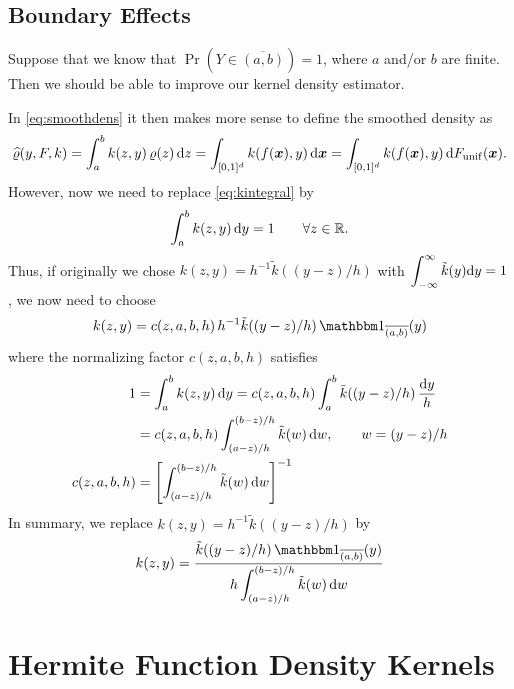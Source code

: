 \documentclass[letterpaper]{amsart}
\newcommand{\hvarrho}{\widehat{\varrho}}
\newcommand{\tk}{\tilde{k}}
\begin{document}
\subsection{Boundary Effects}
Suppose that we know that $\Pr(Y \in \overline{(a,b)}) = 1$, where $a$ and/or $b$ are finite.  Then we should be able to improve our kernel density estimator.

In \eqref{eq:smoothdens} it then makes more sense to define the smoothed density as
\begin{equation}
	\label{eq:smoothdens_bd}
	\hvarrho(y,F,k)
	= \int_{a}^{b} k(z,y) \, \varrho(z) \, \dif z \\
	= \int_{[0,1]^d} k(f(\vx),y) \,  \dif \vx
	= \int_{[0,1]^d} k(f(\vx),y) \,  \dif F_{\mathrm{unif}}(\vx).
\end{equation}
However, now we need to replace \eqref{eq:kintegral} by
\begin{equation}
	\label{eq:kintegral_bd}
	\int_{a}^{b} k(z,y) \, {\rm d} y = 1 \qquad \forall z \in \mathbb{R}.
\end{equation}
Thus, if originally we chose $k(z,y) = h^{-1}\tk((y-z)/h)$ with $\displaystyle\int_{-\infty}^\infty \tk(y) \dif y = 1$, we now need to choose 
\begin{equation*}
    k(z,y) = c(z,a,b,h) \, h^{-1}\tk((y-z)/h) \, \bbone_{\overline{(a,b)}}(y)
\end{equation*}
where the normalizing factor $c(z,a,b,h)$ satisfies
\begin{align*}
    1 & = \int_{a}^{b} k(z,y) \, \dif y = c(z,a,b,h) \int_{a}^{b} \tk((y-z)/h) \, \frac{\dif y}{h} \\
    & = c(z,a,b,h) \int_{(a-z)/h}^{(b-z)/h} \tk(w) \, \dif w,  \qquad w = (y-z)/h \\
    c(z,a,b,h) & = \left[ \int_{(a-z)/h}^{(b-z)/h} \tk(w) \, \dif w\right]^{-1}
\end{align*}
In summary, we replace $k(z,y) = h^{-1}\tk((y-z)/h)$  by
\[
k(z,y)  = \frac{\tk((y-z)/h) \, \bbone_{\overline{(a,b)}}(y)}{h \displaystyle \int_{(a-z)/h}^{(b-z)/h} \tk(w) \, \dif w}
\]

\section{Hermite Function Density Kernels}
\end{document}
